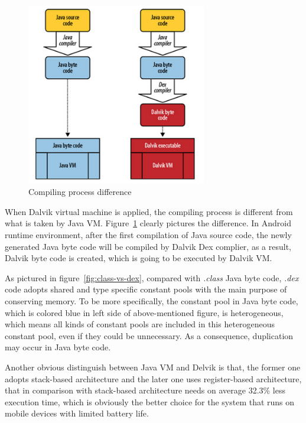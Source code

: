  \begin{figure}[!htbp]
	\centering
	\includegraphics[width=0.7\textwidth]{vm-compare.jpg}
		\caption{Compiling process difference\cite{learn_android}}
	\label{fig:vm-compare}
\end{figure}
When Dalvik virtual machine is applied, the compiling process is different from what is taken by Java VM. Figure~\ref{fig:vm-compare} clearly pictures the difference. In Android runtime environment, after the first compilation of Java source code, the newly generated Java byte code will be compiled by Dalvik Dex complier, as a result, Dalvik byte code is created, which is going to be executed by Dalvik VM.

As pictured in figure~\ref{fig:class-vs-dex}, compared with \emph{.class} Java byte code, \emph{.dex} code adopts shared and type specific constant pools with the main purpose of conserving memory\cite{android_vm}. To be more specifically,  the constant pool in Java byte code, which is colored blue in left side of above-mentioned figure, is heterogeneous, which means all kinds of constant pools are included in this heterogeneous constant pool, even if they could be unnecessary. As a consequence, duplication may occur in Java byte code.    

Another obvious distinguish between Java VM and Delvik is that, the former one adopts stack-based architecture and  the later one uses register-based architecture, that in comparison with stack-based architecture needs on average 32.3\% less execution time\cite{android_vm}, which is obviously the better choice for the system that runs on mobile devices with limited battery life.

